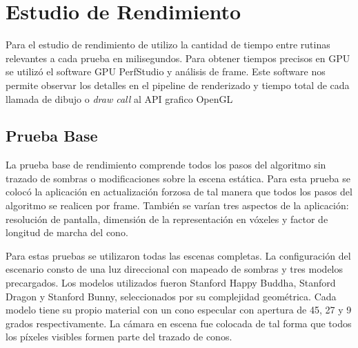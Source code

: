 \section{Estudio de Rendimiento}

Para el estudio de rendimiento de utilizo la cantidad de tiempo entre rutinas relevantes a cada prueba en milisegundos. Para obtener tiempos precisos en GPU se utilizó el software GPU PerfStudio y análisis de frame. Este software nos permite observar los detalles en el pipeline de renderizado y tiempo total de cada llamada de dibujo o \emph{draw call} al API grafico OpenGL

\subsection{Prueba Base}
La prueba base de rendimiento comprende todos los pasos del algoritmo sin trazado de sombras o modificaciones sobre la escena estática. Para esta prueba se colocó la aplicación en actualización forzosa de tal manera que todos los pasos del algoritmo se realicen por frame. También se varían tres aspectos de la aplicación: resolución de pantalla, dimensión de la representación en vóxeles y factor de longitud de marcha del cono.

Para estas pruebas se utilizaron todas las escenas completas. La configuración del escenario consto de una luz direccional con mapeado de sombras y tres modelos precargados. Los modelos utilizados fueron Stanford Happy Buddha, Stanford Dragon y Stanford Bunny, seleccionados por su complejidad geométrica. Cada modelo tiene su propio material con un cono especular con apertura de 45, 27 y 9 grados respectivamente. La cámara en escena fue colocada de tal forma que todos los píxeles  visibles formen parte del trazado de conos. 

